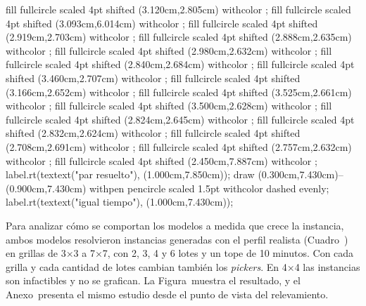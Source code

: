 {fill fullcircle scaled 4pt shifted (3.120cm,2.805cm) withcolor ;
fill fullcircle scaled 4pt shifted (3.093cm,6.014cm) withcolor ;
fill fullcircle scaled 4pt shifted (2.919cm,2.703cm) withcolor ;
fill fullcircle scaled 4pt shifted (2.888cm,2.635cm) withcolor ;
fill fullcircle scaled 4pt shifted (2.980cm,2.632cm) withcolor ;
fill fullcircle scaled 4pt shifted (2.840cm,2.684cm) withcolor ;
fill fullcircle scaled 4pt shifted (3.460cm,2.707cm) withcolor ;
fill fullcircle scaled 4pt shifted (3.166cm,2.652cm) withcolor ;
fill fullcircle scaled 4pt shifted (3.525cm,2.661cm) withcolor ;
fill fullcircle scaled 4pt shifted (3.500cm,2.628cm) withcolor ;
fill fullcircle scaled 4pt shifted (2.824cm,2.645cm) withcolor ;
fill fullcircle scaled 4pt shifted (2.832cm,2.624cm) withcolor ;
fill fullcircle scaled 4pt shifted (2.708cm,2.691cm) withcolor ;
fill fullcircle scaled 4pt shifted (2.757cm,2.632cm) withcolor ;
fill fullcircle scaled 4pt shifted (2.450cm,7.887cm) withcolor ;
label.rt(textext("\tfx par resuelto"), (1.000cm,7.850cm));
draw (0.300cm,7.430cm)--(0.900cm,7.430cm) withpen pencircle scaled 1.5pt withcolor  dashed evenly;
label.rt(textext("\tfx igual tiempo"), (1.000cm,7.430cm));
\stopMPcode}

\stopsubsection

\startsubsection[title={Escala}]

Para analizar cómo se comportan los modelos a medida que crece la instancia,
ambos modelos resolvieron instancias generadas con el perfil realista (Cuadro~) en
grillas de 3×3 a 7×7, con 2, 3, 4 y 6 lotes y un tope de 10 minutos. Con cada
grilla y cada cantidad de lotes cambian también los {\em pickers}. En 4×4 las
instancias son infactibles y no se grafican. La Figura~
muestra el resultado, y el Anexo~ presenta el mismo
estudio desde el punto de vista del relevamiento.

